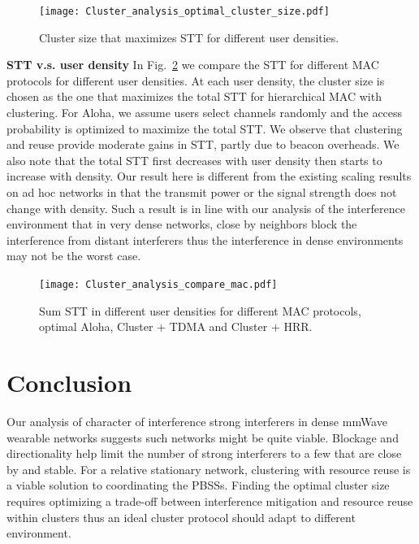 \documentclass[10pt, conference, letterpaper]{IEEEtran}
\begin{document}
\begin{figure}
	\centering
	\texttt{[image: Cluster\_analysis\_optimal\_cluster\_size.pdf]}
	\caption{Cluster size that maximizes STT for different user densities.}
	\label{fig:clustereanalysis:optimal_cluster_size}
\end{figure}

\textbf{STT v.s. user density} In Fig.~\ref{fig:clusteranalysis:compare_mac} we compare the STT for different MAC protocols for different user densities. 
At each user density, the cluster size is chosen as the one that maximizes the total STT for hierarchical MAC with clustering. 
For Aloha, we assume users select channels randomly and the access probability is optimized to maximize the total STT. 
We observe that clustering and reuse provide moderate gains in STT, partly due to beacon overheads. %
We also note that the total STT first decreases with user density then starts to increase with density.
Our result here is different from the existing scaling results on ad hoc networks in that the transmit power or the signal strength does not change with density.
Such a result is in line with our analysis of the interference environment that in very dense networks, close by neighbors block the interference from distant interferers thus the interference in dense environments may not be the worst case. 
 

\begin{figure}
	\centering
	\texttt{[image: Cluster\_analysis\_compare\_mac.pdf]}
	\caption{Sum STT in different user densities for different MAC protocols, optimal Aloha, Cluster + TDMA and Cluster + HRR.}
	\label{fig:clusteranalysis:compare_mac}
\end{figure}


\section{Conclusion}\label{section:conclusion}	
Our analysis of character of interference strong interferers in dense mmWave wearable networks suggests such networks might be quite viable. 
Blockage and directionality help limit the number of strong interferers to a few that are close by and stable.
For a relative stationary network, clustering with resource reuse is a viable solution to coordinating the PBSSs. 
Finding the optimal cluster size requires optimizing a trade-off between interference mitigation and resource reuse within clusters thus an ideal cluster protocol should adapt to different environment. 
\end{document}
